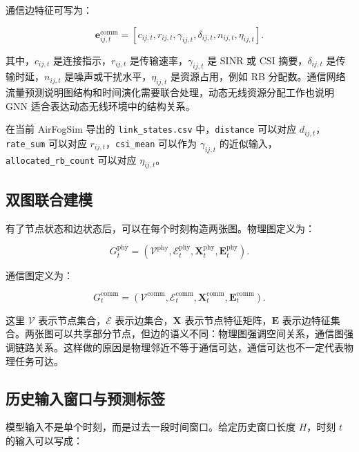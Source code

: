 ﻿\documentclass[UTF8,a4paper,11pt]{ctexart}
\newcommand{\code}[1]{\texttt{#1}}
\begin{document}
通信边特征可写为：

\begin{equation}
\mathbf{e}_{ij,t}^{\mathrm{comm}}
=
\left[
c_{ij,t},
r_{ij,t},
\gamma_{ij,t},
\delta_{ij,t},
n_{ij,t},
\eta_{ij,t}
\right].
\end{equation}

其中，$c_{ij,t}$ 是连接指示，$r_{ij,t}$ 是传输速率，$\gamma_{ij,t}$ 是 SINR 或 CSI 摘要，$\delta_{ij,t}$ 是传输时延，$n_{ij,t}$ 是噪声或干扰水平，$\eta_{ij,t}$ 是资源占用，例如 RB 分配数。通信网络流量预测\cite{qin2024stcomm}说明图结构和时间演化需要联合处理，动态无线资源分配工作\cite{zhou2025continual}也说明 GNN 适合表达动态无线环境中的结构关系。

在当前 AirFogSim 导出的 \code{link\_states.csv} 中，\code{distance} 可以对应 $d_{ij,t}$，\code{rate\_sum} 可以对应 $r_{ij,t}$，\code{csi\_mean} 可以作为 $\gamma_{ij,t}$ 的近似输入，\code{allocated\_rb\_count} 可以对应 $\eta_{ij,t}$。

\subsection{双图联合建模}

有了节点状态和边状态后，可以在每个时刻构造两张图。物理图定义为：

\begin{equation}
G_t^{\mathrm{phy}}
=
\left(
\mathcal{V}^{\mathrm{phy}},
\mathcal{E}_t^{\mathrm{phy}},
\mathbf{X}_t^{\mathrm{phy}},
\mathbf{E}_t^{\mathrm{phy}}
\right).
\end{equation}

通信图定义为：

\begin{equation}
G_t^{\mathrm{comm}}
=
\left(
\mathcal{V}^{\mathrm{comm}},
\mathcal{E}_t^{\mathrm{comm}},
\mathbf{X}_t^{\mathrm{comm}},
\mathbf{E}_t^{\mathrm{comm}}
\right).
\end{equation}

这里 $\mathcal{V}$ 表示节点集合，$\mathcal{E}$ 表示边集合，$\mathbf{X}$ 表示节点特征矩阵，$\mathbf{E}$ 表示边特征集合。两张图可以共享部分节点，但边的语义不同：物理图强调空间关系，通信图强调链路关系。这样做的原因是物理邻近不等于通信可达，通信可达也不一定代表物理任务可达。

\subsection{历史输入窗口与预测标签}

模型输入不是单个时刻，而是过去一段时间窗口。给定历史窗口长度 $H$，时刻 $t$ 的输入可以写成：
\end{document}
